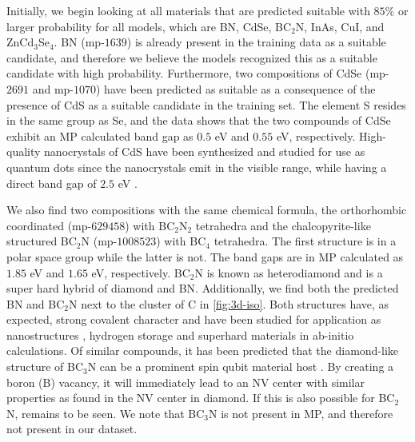 




\noindent Initially, we begin looking at all materials that are predicted suitable with $85\%$ or larger probability for all models, which are BN, CdSe, BC$_2$N, InAs, CuI, and ZnCd$_3$Se$_4$. BN (mp-$1639$) is already present in the training data as a suitable candidate, and therefore we believe the models recognized this as a suitable candidate with high probability. Furthermore, two compositions of CdSe (mp-$2691$ and mp-$1070$) have been predicted as suitable as a consequence of the presence of CdS as a suitable candidate in the training set. The element S resides in the same group as Se, and the data shows that the two compounds of CdSe exhibit an MP calculated band gap as $0.5$ eV and $0.55$ eV, respectively. High-quality nanocrystals of CdS have been synthesized and studied for use as quantum dots since the nanocrystals emit in the visible range, while having a direct band gap of $2.5$ eV \cite{CelebiSerdar2007SaCo, BanerjeeR2000Eots}. %

We also find two compositions with the same chemical formula, the orthorhombic coordinated (mp-$629458$) with BC$_2$N$_2$ tetrahedra and the chalcopyrite-like structured BC$_2$N (mp-$1008523$) with BC$_4$ tetrahedra. The first structure is in a polar space group while the latter is not. The band gaps are in MP calculated as $1.85$ eV and $1.65$ eV, respectively. BC$_2$N is known as heterodiamond and is a super hard hybrid of diamond and BN. Additionally, we find both the predicted BN and BC$_2$N next to the cluster of C in \autoref{fig:3d-iso}.
Both structures have, as expected, strong covalent character and have been studied for application as nanostructures \cite{Gao2017}, hydrogen storage \cite{Cai2017} and superhard materials \cite{Li2017, Jiang2020} in ab-initio calculations. Of similar compounds, it has been predicted that the diamond-like structure of BC$_3$N can be a prominent spin qubit material host \cite{WangDuo2020Sqbo}. By creating a boron (B) vacancy, it will immediately lead to an NV center with similar properties as found in the NV center in diamond. If this is also possible for BC$_2$N, remains to be seen. We note that BC$_3$N is not present in MP, and therefore not present in our dataset.

